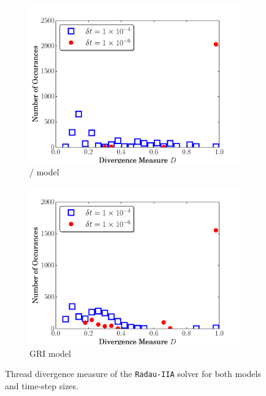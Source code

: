 \documentclass[final,twocolumn]{elsarticle}
\begin{document}
\begin{figure}[htb]
  \ifmeasure
  \fontsize{8pt}{10pt}\selectfont
  \fi
  \centering
  \begin{subfigure}{0.49\textwidth}
      \includegraphics[width=\linewidth]{H2_radau2a_div.pdf}
      \caption{\slash{} model}
  \end{subfigure}
  \begin{subfigure}{0.49\textwidth}
      \includegraphics[width=\linewidth]{CH4_radau2a_div.pdf}
      \caption{GRI model}
  \end{subfigure}
  \caption{Thread divergence measure of the \texttt{Radau-IIA} solver for both models and time-step sizes.}
  \label{F:divergence}
\end{figure}
\end{document}
